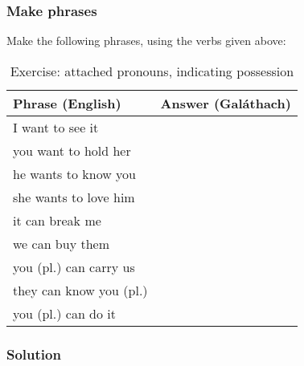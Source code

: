 \subsubsection{Make phrases}

Make the following phrases, using the verbs given above:
\begin{table}[H]
\centering
\begin{tabular}{|l|M{10.0cm}|}
  \toprule
  \textbf{Phrase (English)} & \textbf{Answer (Gal\'{a}thach)}\\
  \midrule
  I want to see it & \\
  \midrule
  you want to hold her & \\
  \midrule
  he wants to know you & \\
  \midrule
  she wants to love him & \\
  \midrule
  it can break me & \\
  \midrule
  we can buy them & \\
  \midrule
  you (pl.) can carry us & \\
  \midrule
  they can know you (pl.) & \\
  \midrule
  you (pl.) can do it & \\
  \bottomrule
\end{tabular}
\label{exercise_attached_pronouns_indicating_possession}
\caption{Exercise: attached pronouns, indicating possession}
\end{table}

\newpage
\subsubsection{Solution}
\begin{table}[H]
\centering
{}
\label{solution_attached_pronouns_indicating_possession}
\caption{Solution: attached pronouns, indicating possession}
\end{table}
